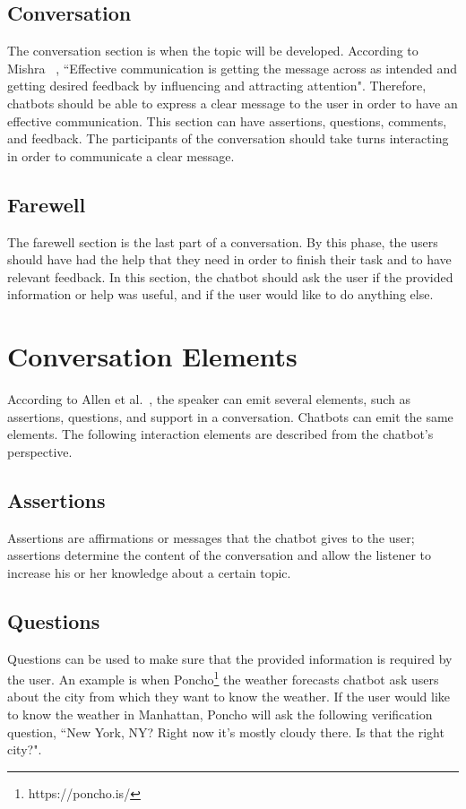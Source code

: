 \documentclass[a4paper,10pt]{article}
\begin{document}
\subsection{Conversation}
The conversation section is when the topic will be developed. According to Mishra ~\cite{effectivCommunication}, ``Effective communication is getting the message across as intended and getting desired feedback by influencing and attracting attention". Therefore, chatbots should be able to express a clear message to the user in order to have an effective communication. This section can have assertions, questions, comments, and feedback. The participants of the conversation should take turns interacting in order to communicate a clear message.

\subsection{Farewell}
The farewell section is the last part of a conversation. By this phase, the users should have had the help that they need in order to finish their task and to have relevant feedback. In this section, the chatbot should ask the user if the provided information or help was useful, and if the user would like to do anything else. 

\section{Conversation Elements}
According to Allen et al.~\cite{allen1978conversation}, the speaker can emit several elements, such as assertions, questions, and support in a conversation. Chatbots can emit the same elements. The following interaction elements are described from the chatbot's perspective. 

\subsection{Assertions}
Assertions are affirmations or messages that the chatbot gives to the user; assertions determine the content of the conversation and allow the listener to increase his or her knowledge about a certain topic. 

\subsection{Questions}
Questions can be used to make sure that the provided information is required by the user. An example is when Poncho\footnote{https://poncho.is/} the weather forecasts chatbot ask users about the city from which they want to know the weather. If the user would like to know the weather in Manhattan, Poncho will ask the following verification question, ``New York, NY? Right now it's mostly cloudy there. Is that the right city?".
\end{document}

